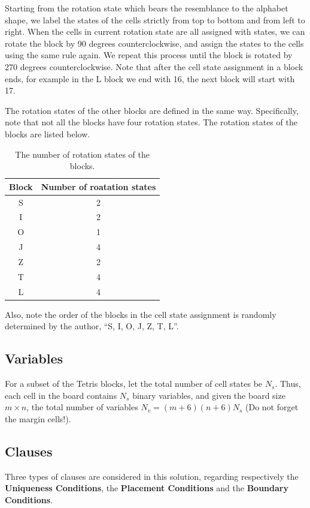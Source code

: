 \documentclass[12pt, a4paper]{article}
\theoremstyle{mystyle}
\begin{document}
        Starting from the rotation state which bears the resemblance to the alphabet shape, we label the states of the cells strictly from top to bottom and from left to right. When the cells in current rotation state are all assigned with states, we can rotate the block by 90 degrees counterclockwise, and assign the states to the cells using the same rule again. We repeat this process until the block is rotated by 270 degrees counterclockwise. Note that after the cell state assignment in a block ends, for example in the L block we end with 16, the next block will start with 17. \par
        The rotation states of the other blocks are defined in the same way. Specifically, note that not all the blocks have four rotation states. The rotation states of the blocks are listed below.
        \begin{table}[H]
            \centering
            \begin{tabular}{cc}
                \hline
                Block & Number of roatation states \\
                \hline
                S & 2 \\
                \hline
                I & 2 \\
                \hline
                O & 1 \\
                \hline
                J & 4 \\
                \hline
                Z & 2 \\
                \hline
                T & 4 \\
                \hline
                L & 4 \\
                \hline
            \end{tabular}
            \caption{The number of rotation states of the blocks.}
        \end{table}
        Also, note the order of the blocks in the cell state assignment is randomly determined by the author, ``S, I, O, J, Z, T, L''.
        \subsection{Variables}
        For a subset of the Tetris blocks, let the total number of cell states be $N_s$. Thus, each cell in the board contains $N_s$ binary variables, and given the board size $m\times n$, the total number of variables $N_v = (m+6)(n+6)N_s$ (Do not forget the margin cells!). \par
        \subsection{Clauses}
        Three types of clauses are considered in this solution, regarding respectively the \textbf{Uniqueness Conditions}, the \textbf{Placement Conditions} and the \textbf{Boundary Conditions}.
\end{document}
